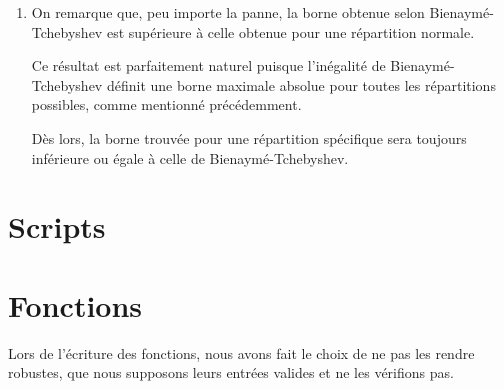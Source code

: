 \documentclass[a4paper, 12pt]{article}
\renewcommand{\thesubsection}{\thesection.\alph{subsection}}
\begin{document}
\begin{enumerate}[label=\roman*.]
\begin{table}[H]
		\label{table:Q4aii}
	\end{table}
	\item On remarque que, peu importe la panne, la borne obtenue selon Bienaymé-Tchebyshev est supérieure à celle obtenue pour une répartition normale. \par
	Ce résultat est parfaitement naturel puisque l'inégalité de Bienaymé-Tchebyshev définit une borne maximale absolue pour toutes les répartitions possibles, comme mentionné précédemment. \par
	Dès lors, la borne trouvée pour une répartition spécifique sera toujours inférieure ou égale à celle de Bienaymé-Tchebyshev.
\end{enumerate}
\newpage
\appendix
\renewcommand{\thesubsection}{\arabic{subsection}}
\section{Scripts}










\newpage
\section{Fonctions}
Lors de l'écriture des fonctions, nous avons fait le choix de ne pas les rendre robustes, \cad que nous supposons leurs entrées valides et ne les vérifions pas.


\end{document}
